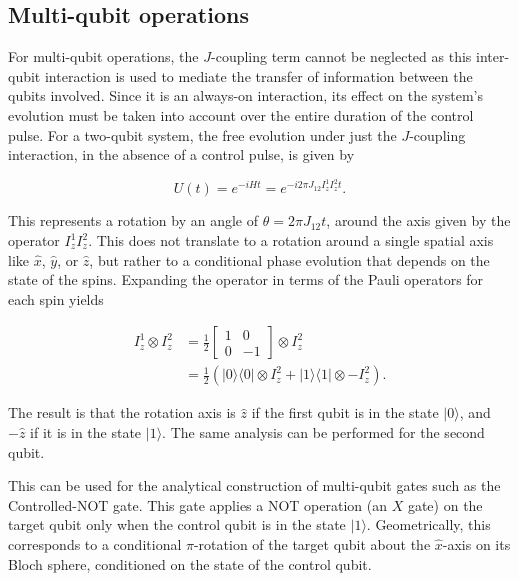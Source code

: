 \subsection{Multi-qubit operations}
\label{subsec:multi_qubit_operations}

For multi-qubit operations, the \(J\)-coupling term cannot be neglected as this inter-qubit interaction is used to mediate the transfer of information between the qubits involved. Since it is an always-on interaction, its effect on the system’s evolution must be taken into account over the entire duration of the control pulse. For a two-qubit system, the free evolution under just the \(J\)-coupling interaction, in the absence of a control pulse, is given by

\begin{equation}
    U(t)=e^{-iHt}=e^{-i2\pi J_{12}I_z^1I_z^2t}.
    \label{eq:J_coupling_evo}
\end{equation}

This represents a rotation by an angle of \(\theta =2\pi J_{12}t\), around the axis given by the operator \(I_z^1I_z^2\). This does not translate to a rotation around a single spatial axis like \(\hat{x}\), \(\hat{y}\), or \(\hat{z}\), but rather to a conditional phase evolution that depends on the state of the spins. Expanding the operator in terms of the Pauli operators for each spin yields

\begin{equation}
\begin{aligned}
    I_z^1\otimes I_z^2 &=\frac{1}{2}\begin{bmatrix}
        1 & 0 \\
        0 & -1 
    \end{bmatrix}\otimes I_z^2 \\&=\frac{1}{2}\left(|0\rangle\langle 0| \otimes I_z^2+|1\rangle\langle 1| \otimes -I_z^2\right).
    \label{eq:Jcoup_ZZoperator}
\end{aligned}
\end{equation}

The result is that the rotation axis is \(\hat{z}\) if the first qubit is in the state \(|0\rangle\), and \(-\hat{z}\) if it is in the state \(|1\rangle\). The same analysis can be performed for the second qubit.

This can be used for the analytical construction of multi-qubit gates such as the Controlled-NOT gate. This gate applies a NOT operation (an \(X\) gate) on the target qubit only when the control qubit is in the state \(|1\rangle\). Geometrically, this corresponds to a conditional \(\pi\)-rotation of the target qubit about the \(\hat{x}\)-axis on its Bloch sphere, conditioned on the state of the control qubit.

